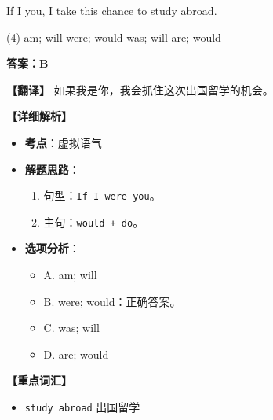 \documentclass[11pt, a4paper]{article}
\newcommand{\analysis}[4]{
    \begin{solutionbox}
        \textbf{答案：#1}
        
        \textbf{【翻译】} #2
        
        \textbf{【详细解析】}
        #3
        
        \textbf{【重点词汇】}
        #4
    \end{solutionbox}
}
\newcommand{\blank}{\underline{\hspace{1.5cm}}}
\begin{document}
\begin{questions}
    \item If I \blank you, I \blank take this chance to study abroad.
    \begin{tasks}(4)
        \task am; will \task were; would \task was; will \task are; would
    \end{tasks}
    \analysis{B}{如果我是你，我会抓住这次出国留学的机会。}{
        \begin{itemize}
            \item \textbf{考点}：虚拟语气
            \item \textbf{解题思路}：
                \begin{enumerate}
                    \item 句型：\texttt{If I were you}。
                    \item 主句：\texttt{would + do}。
                \end{enumerate}
            \item \textbf{选项分析}：
                \begin{itemize}
                    \item A. am; will
                    \item B. were; would：正确答案。
                    \item C. was; will
                    \item D. are; would
                \end{itemize}
        \end{itemize}
    }{
        \begin{itemize}
            \item \texttt{study abroad} 出国留学
        \end{itemize}
    }


\end{questions}
\end{document}
